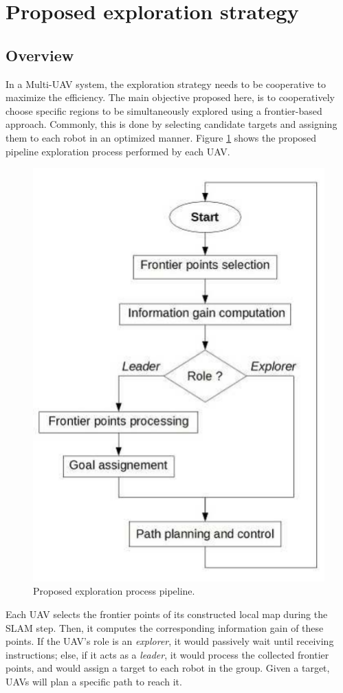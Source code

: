 \documentclass[11pt,openany]{book}
\begin{document}
\section{Proposed exploration strategy}
\subsection{Overview}
In a Multi-UAV system, the exploration strategy needs to be cooperative to maximize the eﬃciency. The main objective proposed here, is to cooperatively choose speciﬁc regions to be simultaneously explored using a frontier-based approach. Commonly, this is done by selecting candidate targets and assigning them to each robot in an optimized manner. Figure \ref{fig:3.1} shows the proposed pipeline exploration process performed by each UAV.
\begin{figure}[H]
    \centering
    \includegraphics[scale=0.6]{assets/3_1.png}
    \caption{Proposed exploration process pipeline.}
    \label{fig:3.1}
\end{figure}
Each UAV selects the frontier points of its constructed local map during the SLAM step. Then, it computes the corresponding information gain of these points. If the UAV’s role is an \textit{explorer}, it would passively wait until receiving instructions; else, if it acts as a \textit{leader}, it would process the collected frontier points, and would assign a target to each robot in the group. Given a target, UAVs will plan a speciﬁc path to reach it.\\\\
\end{document}
